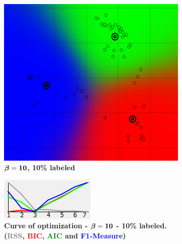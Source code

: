 \begin{figure}[h]
\centering
	\begin{subfigure}[h]{0.25\textwidth}
    \centering
	\includegraphics[height=0.15\textheight]{./clustering/opt_F1_10__soft_k__beta_10_range7.png}
	\caption{$\boldsymbol \beta \bf = 10$\bf, 10\% labeled}
    \label{fig:figure10a}
	\end{subfigure}
    \hspace{20mm}
    \begin{subfigure}[h]{0.50\textwidth}
    \centering
	\includegraphics[height=0.15\textheight]{./clustering/curve_opt_F1_10__soft_k__beta_10_range7.png}
	\caption{\bf Curve of optimization - $ \boldsymbol \beta \bf = 10$ - 10\% labeled. (\textcolor{gray}{RSS}, \textcolor{red}{BIC}, \textcolor{green}{AIC} and \textcolor{blue}{F1-Measure})}
    \label{fig:figure10c}
	\end{subfigure}\\
    \begin{subfigure}[h]{0.25\textwidth}
    \centering

\end{subfigure}
\end{figure}
